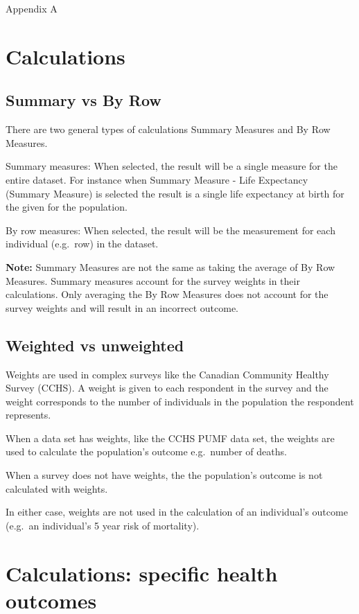 \documentclass[]{book}
\begin{document}
Appendix A

\section{Calculations}\label{calculations}

\subsection{Summary vs By Row}\label{summary-vs-by-row}

There are two general types of calculations Summary Measures and By Row
Measures.

Summary measures: When selected, the result will be a single measure for
the entire dataset. For instance when Summary Measure - Life Expectancy
(Summary Measure) is selected the result is a single life expectancy at
birth for the given for the population.

By row measures: When selected, the result will be the measurement for
each individual (e.g.~row) in the dataset.

\textbf{Note:} Summary Measures are not the same as taking the average
of By Row Measures. Summary measures account for the survey weights in
their calculations. Only averaging the By Row Measures does not account
for the survey weights and will result in an incorrect outcome.

\subsection{Weighted vs unweighted}\label{weighted-vs-unweighted}

Weights are used in complex surveys like the Canadian Community Healthy
Survey (CCHS). A weight is given to each respondent in the survey and
the weight corresponds to the number of individuals in the population
the respondent represents.

When a data set has weights, like the CCHS PUMF data set, the weights
are used to calculate the population's outcome e.g.~number of deaths.

When a survey does not have weights, the the population's outcome is not
calculated with weights.

In either case, weights are not used in the calculation of an
individual's outcome (e.g.~an individual's 5 year risk of mortality).

\section{Calculations: specific health
outcomes}\label{calculations-specific-health-outcomes}
\end{document}
